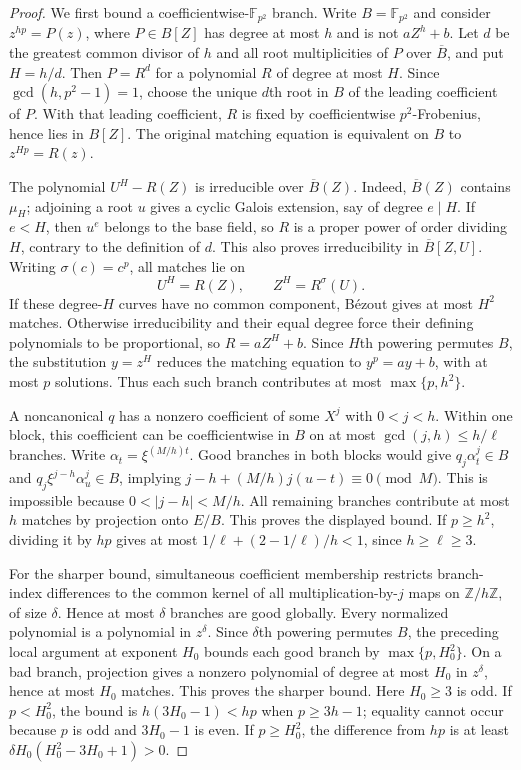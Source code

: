 \begin{proof}
We first bound a coefficientwise-$\mathbb F_{p^2}$ branch. Write
$B=\mathbb F_{p^2}$ and consider $z^{hp}=P(z)$, where $P\in B[Z]$
has degree at most $h$ and is not $aZ^h+b$.
Let $d$ be the greatest common divisor of $h$ and all root
multiplicities of $P$ over $\overline B$, and put $H=h/d$.
Then $P=R^d$ for a polynomial $R$ of degree at most $H$.
Since $\gcd(h,p^2-1)=1$, choose the unique $d$th root in $B$ of the
leading coefficient of $P$. With that leading coefficient, $R$ is fixed
by coefficientwise $p^2$-Frobenius, hence lies in $B[Z]$.
The original matching equation is equivalent on $B$ to $z^{Hp}=R(z)$.

The polynomial $U^H-R(Z)$ is irreducible over $\overline B(Z)$.
Indeed, $\overline B(Z)$ contains $\mu_H$; adjoining a root $u$ gives
a cyclic Galois extension, say of degree $e\mid H$.
If $e<H$, then $u^e$ belongs to the base field, so $R$ is a proper
power of order dividing $H$, contrary to the definition of $d$.
This also proves irreducibility in $\overline B[Z,U]$.
Writing $\sigma(c)=c^p$, all matches lie on
\[
 U^H=R(Z),\qquad Z^H=R^\sigma(U).
\]
If these degree-$H$ curves have no common component, B\'ezout gives
at most $H^2$ matches. Otherwise irreducibility and their equal degree
force their defining polynomials to be proportional, so
$R=aZ^H+b$. Since $H$th powering permutes $B$, the substitution
$y=z^H$ reduces the matching equation to $y^p=ay+b$, with at most
$p$ solutions. Thus each such branch contributes at most
$\max\{p,h^2\}$.

A noncanonical $q$ has a nonzero coefficient of some $X^j$ with
$0<j<h$. Within one block, this coefficient can be
coefficientwise in $B$ on at most $\gcd(j,h)\le h/\ell$ branches.
Write $\alpha_t=\xi^{(M/h)t}$. Good branches in both blocks would give
$q_j\alpha_t^j\in B$ and $q_j\xi^{j-h}\alpha_u^j\in B$, implying
$j-h+(M/h)j(u-t)\equiv0\pmod M$. This is impossible because
$0<|j-h|<M/h$.
All remaining branches contribute at most $h$ matches by projection
onto $E/B$. This proves the displayed bound. If $p\ge h^2$, dividing
it by $hp$ gives at most
$1/\ell+(2-1/\ell)/h<1$, since $h\ge\ell\ge3$.

For the sharper bound, simultaneous coefficient membership restricts
branch-index differences to the common kernel of all multiplication-by-$j$
maps on $\mathbb Z/h\mathbb Z$, of size $\delta$. Hence at most
$\delta$ branches are good globally. Every normalized polynomial is a
polynomial in $z^\delta$. Since $\delta$th powering permutes $B$,
the preceding local argument at exponent $H_0$ bounds each good branch
by $\max\{p,H_0^2\}$. On a bad branch, projection gives a nonzero
polynomial of degree at most $H_0$ in $z^\delta$, hence at most $H_0$
matches. This proves the sharper bound. Here $H_0\ge3$ is odd.
If $p<H_0^2$, the bound is $h(3H_0-1)<hp$ when $p\ge3h-1$;
equality cannot occur because $p$ is odd and $3H_0-1$ is even.
If $p\ge H_0^2$, the difference from $hp$ is at least
$\delta H_0(H_0^2-3H_0+1)>0$.
\end{proof}
